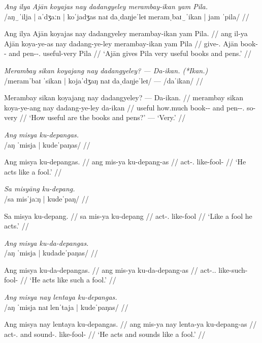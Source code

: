 \documentclass[12pt,a4paper]{scrartcl}
\newcommand{\PargI}{{\Parg}.{\Inan}}
\newcommand{\TsgM}{{\Tsg}.{\M}}
\begin{document}
\ex\begingl
\glpreamble \textit{Ang ilya Ajān koyajas nay dadangyeley merambay-ikan yam Pila.}\\
	/aŋ‿ˈilja | aˈdʒaːn | koˈjadʒas naɪ daˌdaŋjeˈleɪ meramˌbaɪ‿ˈikan | jam ˈpila/ //

\gla Ang ilya Ajān koyajas nay dadangyeley merambay-ikan yam Pila. //
\glb ang il-ya Ajān koya-ye-as nay dadang-ye-ley merambay-ikan yam Pila //
\glc \AgtT{} give-\TsgM{} Ajān book-\Pl{}-\Parg{} and pen-\Pl{}-\PargI{} useful-very \Dat{} Pila //
\glft `Ajān gives Pila very useful books and pens.' //
\endgl\xe

\ex\begingl
\glpreamble \textit{Merambay sikan koyajang nay dadangyeley? — Da-ikan. (*Ikan.)}\\
	/meramˈbaɪ ˈsikan | kojaˈdʒaŋ naɪ daˌdaŋjeˈleɪ/ — /daˈikan/ //

\gla Merambay sikan koyajang nay dadangyeley? — Da-ikan. //
\glb merambay sikan koya-ye-ang nay dadang-ye-ley {} da-ikan //
\glc useful how.much book-\Pl{}-\Aarg{} and pen-\Pl{}-\PargI{} {} so-very //
\glft `How useful are the books and pens?' — `Very.' //
\endgl\xe

\ex\begingl
\glpreamble \textit{Ang misya ku-depangas.}\\
	/aŋ ˈmisja | kudeˈpaŋas/ //

\gla Ang misya ku-depangas. //
\glb ang mis-ya ku-depang-as //
\glc \AgtT{} act-\TsgM{} like-fool-\Parg{} //
\glft `He acts like a fool.' //
\endgl\xe

\ex\begingl
\glpreamble \textit{Sa misyāng ku-depang.}\\
	/sa misˈjaːŋ | kudeˈpaŋ/ //

\gla Sa misya ku-depang. //
\glb sa mis-ya ku-depang //
\glc \PatT{} act-\TsgM{} like-fool //
\glft `Like a fool he acts.' //
\endgl\xe

\ex\begingl
\glpreamble \textit{Ang misya ku-da-depangas.}\\
	/aŋ ˈmisja | kudadeˈpaŋas/ //

\gla Ang misya ku-da-depangas. //
\glb ang mis-ya ku-da-depang-as //
\glc \AgtT{} act-\TsgM{}.\Aarg{} like-such-fool-\Parg{} //
\glft `He acts like such a fool.' //
\endgl\xe

\ex\begingl
\glpreamble \textit{Ang misya nay lentaya ku-depangas.}\\
	/aŋ ˈmisja naɪ lenˈtaja | kudeˈpaŋas/ //

\gla Ang misya nay lentaya ku-depangas. //
\glb ang mis-ya nay lenta-ya ku-depang-as //
\glc \AgtT{} act-\TsgM{} and sound-\TsgM{} like-fool-\Parg{} //
\glft `He acts and sounds like a fool.' //
\endgl\xe
\end{document}

